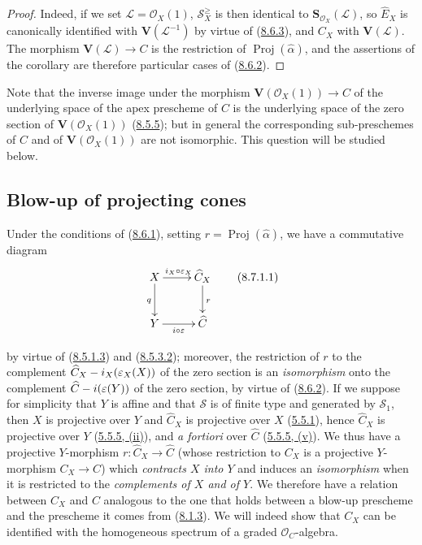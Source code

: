 \begin{proof}
Indeed, if we set $\mathcal{L}=\mathcal{O}_X(1)$,
$\mathcal{S}_X^{\geq}$ is then identical to
$\mathbf{S}_{\mathcal{O}_X}(\mathcal{L})$, so $\widehat{E}_X$ is canonically
identified with $\mathbf{V}(\mathcal{L}^{-1})$ by virtue of
(\hyperref[II.8.6.3]{8.6.3}), and $C_X$ with $\mathbf{V}(\mathcal{L})$. The
morphism $\mathbf{V}(\mathcal{L})\to C$ is the restriction of
$\operatorname{Proj}(\widehat{\alpha})$, and the assertions of the corollary are
therefore particular cases of (\hyperref[II.8.6.2]{8.6.2}).
\end{proof}

Note that the inverse image under the morphism
$\mathbf{V}(\mathcal{O}_X(1))\to C$ of the underlying space of the apex
prescheme of $C$ is the underlying space of the zero section of
$\mathbf{V}(\mathcal{O}_X(1))$ (\hyperref[II.8.5.5]{8.5.5}); but in
general the corresponding sub-preschemes of $C$ and of
$\mathbf{V}(\mathcal{O}_X(1))$ are not isomorphic. This question will be
studied below.

\subsection{Blow-up of projecting cones}
\label{subsection:II.8.7}

\begin{env}[8.7.1]
\label{II.8.7.1}
Under the conditions of (\hyperref[II.8.6.1]{8.6.1}), setting
$r=\operatorname{Proj}(\widehat{\alpha})$, we have a commutative diagram
\begin{equation}
\label{II.8.7.1.1}
  \xymatrix{
    X\ar[r]^{i_X\circ\varepsilon_X}\ar[d]_{q} &
    \widehat{C}_X\ar[d]^{r}\\
    Y\ar[r]_{i\circ\varepsilon} & \widehat{C}
  }
\tag{8.7.1.1}
\end{equation}

by virtue of (\hyperref[II.8.5.1.3]{8.5.1.3}) and
(\hyperref[II.8.5.3.2]{8.5.3.2}); moreover, the restriction of $r$ to the
complement $\widehat{C}_X- i_X(\varepsilon_X(X))$ of the zero section is an
\emph{isomorphism} onto the complement $\widehat{C}- i(\varepsilon(Y))$ of the
zero section, by virtue of (\hyperref[II.8.6.2]{8.6.2}). If we suppose for
simplicity that $Y$ is affine and that $\mathcal{S}$ is of finite type and
generated by $\mathcal{S}_1$, then $X$ is projective over $Y$ and
$\widehat{C}_X$ is projective over $X$ (\hyperref[II.5.5.1]{5.5.1}), hence
$\widehat{C}_X$ is projective over $Y$ (\hyperref[II.5.5.5]{5.5.5, (ii)}),
and \emph{a fortiori} over $\widehat{C}$ (\hyperref[II.5.5.5]{5.5.5, (v)}).
We thus have a projective $Y$-morphism $r:\widehat{C}_X\to\widehat{C}$ (whose
restriction to $C_X$ is a projective $Y$-morphism $C_X\to C$) which
\emph{contracts $X$ into $Y$} and induces an \emph{isomorphism} when it is
restricted to the \emph{complements of $X$ and of $Y$}. We therefore have a
relation between $C_X$ and $C$ analogous to the one that holds between a
blow-up prescheme and the prescheme it comes from
(\hyperref[II.8.1.3]{8.1.3}). We will indeed show that $C_X$ can be
identified with the homogeneous spectrum of a graded $\mathcal{O}_C$-algebra.
\end{env}

